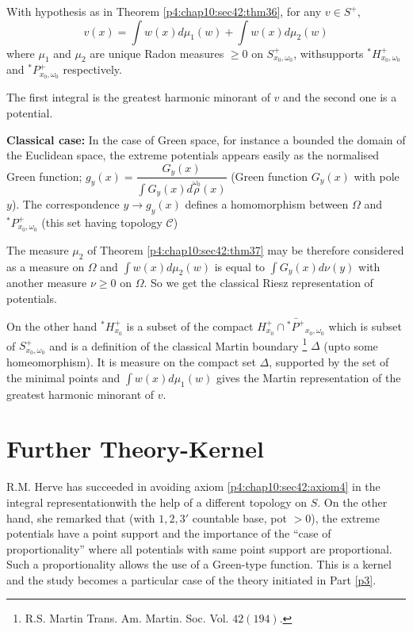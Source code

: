 \begin{thm}\label{p4:chap10:sec42:thm37} %
  With hypothesis as in Theorem \ref{p4:chap10:sec42:thm36}, for
  any $v \in S^+$, 
  $$
  v(x)=\int w(x)d \mu_1(w)+ \int w(x)d \mu_2 (w)
  $$
  where $\mu_1$ and $\mu_2$ are unique Radon measures $\geq 0$ on
  $S^+_{x_0,\omega_0}$, with\pageoriginale supports $^*H^+_{x_0,\omega_0}$ and
  $^*P^+_{x_0,\omega_0}$ respectively. 
\end{thm}

The first integral is the greatest harmonic minorant of $v$ and the
second one is a potential. 

\medskip
\noindent
{\bf Classical case:} In the case of Green space, for instance a
bounded the domain of the Euclidean space, the extreme potentials
appears easily as the normalised Green function; $g_y(x)=
\dfrac{G_y(x)}{\int G_y(x)d \overset{\omega_0}\rho(x)}$ (Green
function $G_y(x)$ with pole $y$). The correspondence $y \to g_y(x)$
defines a homomorphism between $\Omega$ and $^*P^+_{x_0,\omega_0}$
(this set having topology $\mathscr{C}$) 

The measure $\mu_2$ of Theorem \ref{p4:chap10:sec42:thm37} may be
therefore considered as a 
measure on $\Omega$ and $\int w(x)d \mu_2 (w)$ is equal to
$\int G_y(x)d \nu (y)$ with another measure $\nu \geq 0$ on
$\Omega$. So we get the classical Riesz representation of
potentials. 

On the other hand $^*H^+_{x_0}$ is a subset of the compact $H^+_{x_0}
\cap \bar{^*P^+}_{x_0,\omega_0}$ which is subset of
$S^+_{x_0,\omega_0}$ and is a definition of the classical Martin
boundary  \footnote{ R.S. Martin
  Trans. Am. Martin. Soc. Vol. $42(194)$.} $\Delta$ (upto some
homeomorphism). It is measure on the compact set $\Delta$, supported
by the set of the minimal points and $\int w(x)d \mu_1 (w)$ gives the
Martin representation of the greatest harmonic minorant of $v$. 

\section{Further Theory-Kernel}\label{p4:chap10:sec43} %

R.M. Herve has succeeded in avoiding axiom
\ref{p4:chap10:sec42:axiom4} in the integral 
representation\pageoriginale with the help of a different topology on $S$. On the
other hand, she remarked that (with $1,2,3'$ countable base, pot
$>0$), the extreme potentials have a point support and the importance
of the ``case of proportionality'' where all potentials with same point
support are proportional. Such a proportionality allows the use of a
Green-type function. This is a kernel and the study becomes a
particular case of the theory initiated in Part \ref{p3}. 

